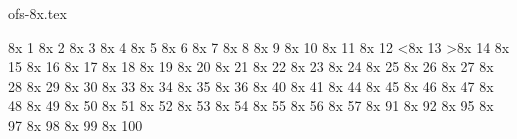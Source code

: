


\protectreading ofs-8x.tex %

\characterdef \minusalt   8x   1
\characterdef \plusalt   8x   2
\characterdef \equalalt   8x   3
\characterdef \dividealt   8x   4
\characterdef \multiplyalt   8x   5
\characterdef \plusminusalt   8x   6
\characterdef \minusplusalt   8x   7
\characterdef \lessalt   8x   8
\characterdef \greateralt   8x   9
\characterdef \greaterequalaltpl   8x   10
\characterdef \lessequalaltpl   8x   11
\characterdef \textminusplus   8x   12
\characterdef \textless   8x   13
\characterdef \textgreater   8x   14
\characterdef \textlessequal   8x   15
\characterdef \textgreaterequal   8x   16
\characterdef \lessequalalt   8x   17
\characterdef \greaterequalalt   8x   18
\characterdef \dotlessisuperior   8x   19
\characterdef \onehalf   8x   20
\characterdef \onequarter   8x   21
\characterdef \onethird   8x   22
\characterdef \oneeighth   8x   23
\characterdef \threeeighths   8x   24
\characterdef \fiveeighths   8x   25
\characterdef \seveneighths   8x   26
\characterdef \threequarters   8x   27
\characterdef \twothirds   8x   28
\characterdef \ligfj   8x   29
\characterdef \ligffj   8x   30
\characterdef \ligst   8x   33
\characterdef \ligct   8x   34
\characterdef \ligTh   8x   35
\characterdef \dollarsuperior   8x   36
\characterdef \parenleftsuperior   8x   40
\characterdef \parenrightsuperior   8x   41
\characterdef \commasuperior   8x   44
\characterdef \hyphensuperior   8x   45
\characterdef \periodsuperior   8x   46
\characterdef \fraction   8x   47
\characterdef \zerosuperior   8x   48
\characterdef \onesuperior   8x   49
\characterdef \twosuperior   8x   50
\characterdef \threesuperior   8x   51
\characterdef \foursuperior   8x   52
\characterdef \fivesuperior   8x   53
\characterdef \sixsuperior   8x   54
\characterdef \sevensuperior   8x   55
\characterdef \eightsuperior   8x   56
\characterdef \ninesuperior   8x   57
\characterdef \sterlingsuperior   8x   91
\characterdef \yensuperior   8x   92
\characterdef \dotaccentsuperior   8x   95
\characterdef \asuperior   8x   97
\characterdef \bsuperior   8x   98
\characterdef \csuperior   8x   99
\characterdef \dsuperior   8x   100

